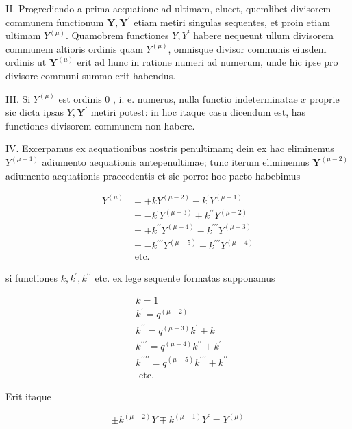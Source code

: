 \documentclass[twoside,12pt, showframe]{memoir}
\begin{document}
II. Progrediendo a prima aequatione ad ultimam, elucet, quemlibet divisorem communem functionum \(\boldsymbol{Y}, \boldsymbol{Y}^{\prime}\) etiam metiri singulas sequentes, et proin etiam ultimam \(Y^{(\mu)}\). Quamobrem functiones \(Y, Y^{\prime}\) habere nequeunt ullum divisorem communem altioris ordinis quam \(Y^{(\mu)}\), omnisque divisor communis eiusdem ordinis ut \(\boldsymbol{Y}^{(\mu)}\) erit ad hunc in ratione numeri ad numerum, unde hic ipse pro divisore communi summo erit habendus.

III. Si \(Y^{(\mu)}\) est ordinis 0 , i. e. numerus, nulla functio indeterminatae \(x\) proprie sic dicta ipsas \(Y, \boldsymbol{Y}^{\prime}\) metiri potest: in hoc itaque casu dicendum est, has functiones divisorem communem non habere.

IV. Excerpamus ex aequationibus nostris penultimam; dein ex hac eliminemus \(Y^{(\mu-1)}\) adiumento aequationis antepenultimae; tunc iterum eliminemus \(\boldsymbol{Y}^{(\mu-2)}\) adiumento aequationis praecedentis et sic porro: hoc pacto habebimus

\[
\begin{aligned}
Y^{(\mu)} & =+k Y^{(\mu-2)}-k^{\prime} Y^{(\mu-1)} \\
& =-k^{\prime} Y^{(\mu-3)}+k^{\prime \prime} Y^{(\mu-2)} \\
& =+k^{\prime \prime} Y^{(\mu-4)}-k^{\prime \prime \prime} Y^{(\mu-3)} \\
& =-k^{\prime \prime \prime} Y^{(\mu-5)}+k^{\prime \prime \prime} Y^{(\mu-4)} \\
& \text { etc. }
\end{aligned}
\]

si functiones \(k, k^{\prime}, k^{\prime \prime}\) etc. ex lege sequente formatas supponamus

\[
\begin{aligned}
& k=1 \\
& k^{\prime}=q^{(\mu-2)} \\
& k^{\prime \prime}=q^{(\mu-3)} k^{\prime}+k \\
& k^{\prime \prime \prime}=q^{(\mu-4)} k^{\prime \prime}+k^{\prime} \\
& k^{\prime \prime \prime \prime}=q^{(\mu-5)} k^{\prime \prime \prime}+k^{\prime \prime} \\
& \text { etc. }
\end{aligned}
\]

Erit itaque

\[
\pm k^{(\mu-2)} Y \mp k^{(\mu-1)} Y^{\prime}=Y^{(\mu)}
\]
\end{document}
